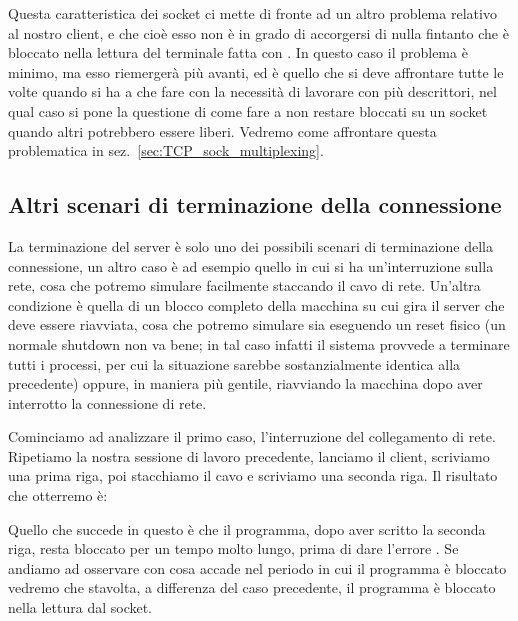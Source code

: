 Questa caratteristica dei socket ci mette di fronte ad un altro problema
relativo al nostro client, e che cioè esso non è in grado di accorgersi di
nulla fintanto che è bloccato nella lettura del terminale fatta con
. In questo caso il problema è minimo, ma esso riemergerà più
avanti, ed è quello che si deve affrontare tutte le volte quando si ha a che
fare con la necessità di lavorare con più descrittori, nel qual caso si pone
la questione di come fare a non restare bloccati su un socket quando altri
potrebbero essere liberi. Vedremo come affrontare questa problematica in
sez.~\ref{sec:TCP_sock_multiplexing}.
 

\subsection{Altri scenari di terminazione della connessione}
\label{sec:TCP_conn_crash}

La terminazione del server è solo uno dei possibili scenari di terminazione
della connessione, un altro caso è ad esempio quello in cui si ha
un'interruzione sulla rete, cosa che potremo simulare facilmente staccando il
cavo di rete.  Un'altra condizione è quella di un blocco completo della
macchina su cui gira il server che deve essere riavviata, cosa che potremo
simulare sia eseguendo un reset fisico (un normale shutdown non va bene; in
tal caso infatti il sistema provvede a terminare tutti i processi, per cui la
situazione sarebbe sostanzialmente identica alla precedente) oppure, in
maniera più gentile, riavviando la macchina dopo aver interrotto la
connessione di rete.

Cominciamo ad analizzare il primo caso, l'interruzione del collegamento di
rete. Ripetiamo la nostra sessione di lavoro precedente, lanciamo il client,
scriviamo una prima riga, poi stacchiamo il cavo e scriviamo una seconda
riga. Il risultato che otterremo è:

Quello che succede in questo è che il programma, dopo aver scritto la seconda
riga, resta bloccato per un tempo molto lungo, prima di dare l'errore
.  Se andiamo ad osservare con  cosa accade
nel periodo in cui il programma è bloccato vedremo che stavolta, a differenza
del caso precedente, il programma è bloccato nella lettura dal socket.

